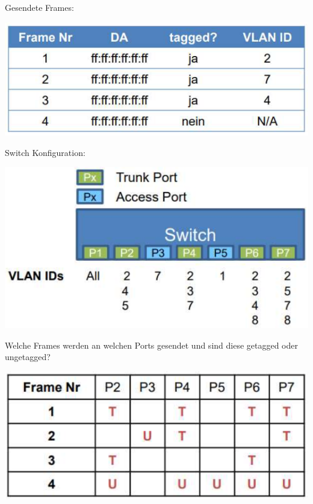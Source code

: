 \begin{example}
    Gesendete Frames:
    \begin{center}
    \includegraphics[width=0.5\linewidth]{images/bsp_vlan.png}
    \end{center}
    Switch Konfiguration:
    \begin{center}
    \includegraphics[width=0.5\linewidth]{images/vlan_example_switch.png}
    \end{center}
    Welche Frames werden an welchen Ports gesendet und sind diese getagged oder ungetagged?
    \begin{center}
    \includegraphics[width=0.5\linewidth]{images/vlan_example_frames.png}
    \end{center}
\end{example}

